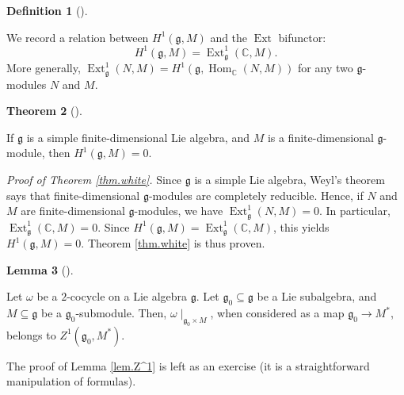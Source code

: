\documentclass
[numbers=enddot,12pt,final,onecolumn,german,notitlepage]{scrartcl}%
\theoremstyle{definition}
\newtheorem{theo}{Theorem}
\newenvironment{theorem}[1][]
{\begin{theo}[#1]\begin{leftbar}}
{\end{leftbar}\end{theo}}
\newtheorem{lem}[theo]{Lemma}
\newenvironment{lemma}[1][]
{\begin{lem}[#1]\begin{leftbar}}
{\end{leftbar}\end{lem}}
\newtheorem{defi}[theo]{Definition}
\newenvironment{definition}[1][]
{\begin{defi}[#1]\begin{leftbar}}
{\end{leftbar}\end{defi}}
\begin{document}
\begin{definition}
We record a relation between $H^{1}\left(  \mathfrak{g},M\right)  $ and the
$\operatorname*{Ext}$ bifunctor:%
\[
H^{1}\left(  \mathfrak{g},M\right)  =\operatorname*{Ext}%
\nolimits_{\mathfrak{g}}^{1}\left(  \mathbb{C},M\right)  .
\]
More generally, $\operatorname*{Ext}\nolimits_{\mathfrak{g}}^{1}\left(
N,M\right)  =H^{1}\left(  \mathfrak{g},\operatorname*{Hom}%
\nolimits_{\mathbb{C}}\left(  N,M\right)  \right)  $ for any two
$\mathfrak{g}$-modules $N$ and $M$.
\end{definition}

\begin{theorem}
[Whitehead]\label{thm.white}If $\mathfrak{g}$ is a simple finite-dimensional
Lie algebra, and $M$ is a finite-dimensional $\mathfrak{g}$-module, then
$H^{1}\left(  \mathfrak{g},M\right)  =0$.
\end{theorem}

\textit{Proof of Theorem \ref{thm.white}.} Since $\mathfrak{g}$ is a simple
Lie algebra, Weyl's theorem says that finite-dimensional $\mathfrak{g}%
$-modules are completely reducible. Hence, if $N$ and $M$ are
finite-dimensional $\mathfrak{g}$-modules, we have $\operatorname*{Ext}%
\nolimits_{\mathfrak{g}}^{1}\left(  N,M\right)  =0$. In particular,
$\operatorname*{Ext}\nolimits_{\mathfrak{g}}^{1}\left(  \mathbb{C},M\right)
=0$. Since $H^{1}\left(  \mathfrak{g},M\right)  =\operatorname*{Ext}%
\nolimits_{\mathfrak{g}}^{1}\left(  \mathbb{C},M\right)  $, this yields
$H^{1}\left(  \mathfrak{g},M\right)  =0$. Theorem \ref{thm.white} is thus proven.

\begin{lemma}
\label{lem.Z^1}Let $\omega$ be a $2$-cocycle on a Lie algebra $\mathfrak{g}$.
Let $\mathfrak{g}_{0}\subseteq\mathfrak{g}$ be a Lie subalgebra, and
$M\subseteq\mathfrak{g}$ be a $\mathfrak{g}_{0}$-submodule. Then, $\omega
\mid_{\mathfrak{g}_{0}\times M}$, when considered as a map $\mathfrak{g}%
_{0}\rightarrow M^{\ast}$, belongs to $Z^{1}\left(  \mathfrak{g}_{0},M^{\ast
}\right)  $.
\end{lemma}

The proof of Lemma \ref{lem.Z^1} is left as an exercise (it is a
straightforward manipulation of formulas).
\end{document}
